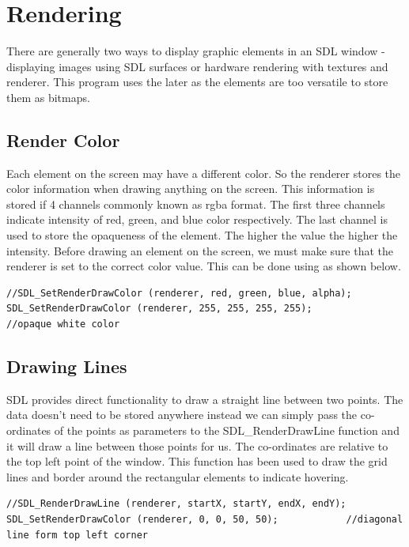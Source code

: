 \documentclass[report]{subfiles}
\begin{document}
    \section{Rendering}
    There are generally two ways to display graphic elements in an SDL window - displaying images using SDL surfaces or hardware rendering with textures and renderer. This program uses the later as the elements are too versatile to store them as bitmaps.
    \subsection{Render Color}
    Each element on the screen may have a different color. So the renderer stores the color information when drawing anything on the screen. This information is stored if 4 channels commonly known as rgba format. The first three channels indicate intensity of red, green, and blue color respectively. The last channel is used to store the opaqueness of the element. The higher the value the higher the intensity. Before drawing an element on the screen, we must make sure that the renderer is set to the correct color value. This can be done using as shown below.
\begin{lstlisting}
//SDL_SetRenderDrawColor (renderer, red, green, blue, alpha);
SDL_SetRenderDrawColor (renderer, 255, 255, 255, 255);          //opaque white color
\end{lstlisting}
		
    	
    \subsection{Drawing Lines}
    SDL provides direct functionality to draw a straight line between two points. The data doesn't need to be stored anywhere instead we can simply pass the co-ordinates of the points as parameters to the SDL\_RenderDrawLine function and it will draw a line between those points for us. The co-ordinates are relative to the top left point of the window. This function has been used to draw the grid lines and border around the rectangular elements to indicate hovering.
\begin{lstlisting}	
//SDL_RenderDrawLine (renderer, startX, startY, endX, endY);
SDL_SetRenderDrawColor (renderer, 0, 0, 50, 50);            //diagonal line form top left corner
\end{lstlisting}
		
    	
\end{document}
